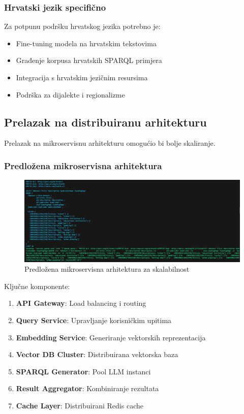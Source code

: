 \subsubsection{Hrvatski jezik specifično}

Za potpunu podršku hrvatskog jezika potrebno je:

\begin{itemize}
    \item Fine-tuning modela na hrvatskim tekstovima
    \item Građenje korpusa hrvatskih SPARQL primjera
    \item Integracija s hrvatskim jezičnim resursima
    \item Podrška za dijalekte i regionalizme
\end{itemize}

\subsection{Prelazak na distribuiranu arhitekturu}

Prelazak na mikroservisnu arhitekturu omogućio bi bolje skaliranje.

\subsubsection{Predložena mikroservisna arhitektura}

\begin{figure}[htbp]
    \centering
    \includegraphics[width=1\textwidth]{figures/izvjestaj_image_82.png}
    \caption{Predložena mikroservisna arhitektura za skalabilnost}
    \label{fig:microservices_architecture}
\end{figure}

Ključne komponente:

\begin{enumerate}
    \item \textbf{API Gateway}: Load balancing i routing
    \item \textbf{Query Service}: Upravljanje korisničkim upitima
    \item \textbf{Embedding Service}: Generiranje vektorskih reprezentacija
    \item \textbf{Vector DB Cluster}: Distribuirana vektorska baza
    \item \textbf{SPARQL Generator}: Pool LLM instanci
    \item \textbf{Result Aggregator}: Kombiniranje rezultata
    \item \textbf{Cache Layer}: Distribuirani Redis cache
\end{enumerate}

